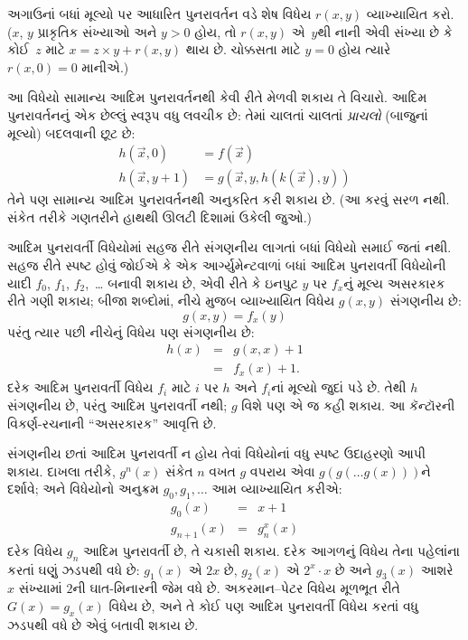 \begin{prob}
  અગાઉનાં બધાં મૂલ્યો પર આધારિત પુનરાવર્તન વડે શેષ વિધેય
  $r(x,y)$ વ્યાખ્યાયિત કરો. ($x$, $y$ પ્રાકૃતિક સંખ્યાઓ અને
  $y > 0$ હોય, તો $r(x,y)$ એ~$y$થી નાની એવી સંખ્યા છે કે કોઈ~$z$
  માટે $x = z\times y + r(x,y)$ થાય છે. ચોક્કસતા માટે $y=0$ હોય
  ત્યારે $r(x,0) = 0$ માનીએ.)
\end{prob}

આ વિધેયો સામાન્ય આદિમ પુનરાવર્તનથી કેવી રીતે મેળવી શકાય તે
વિચારો. આદિમ પુનરાવર્તનનું એક છેલ્લું સ્વરૂપ વધુ લવચીક છે: તેમાં
ચાલતાં ચાલતાં \emph{પ્રાચલો} (બાજુનાં મૂલ્યો) બદલવાની છૂટ છે:
\begin{align*}
h(\vec x, 0) & = f(\vec x) \\
h(\vec x, y+1) & = g(\vec x, y, h(k(\vec x), y))
\end{align*}
તેને પણ સામાન્ય આદિમ પુનરાવર્તનથી અનુકરિત કરી શકાય છે. (આ કરવું
સરળ નથી. સંકેત તરીકે ગણતરીને હાથથી ઊલટી દિશામાં ઉકેલી જુઓ.)
\endgroup


\begingroup
\makeatletter{}\makeatother

\label{guunit:OLP-0223}


આદિમ પુનરાવર્તી વિધેયોમાં સહજ રીતે સંગણનીય લાગતાં બધાં વિધેયો
સમાઈ જતાં નથી. સહજ રીતે સ્પષ્ટ હોવું જોઈએ કે એક આર્ગ્યુમેન્ટવાળાં
બધાં આદિમ પુનરાવર્તી વિધેયોની યાદી
$f_0$, $f_1$, $f_2$,~\dots{} બનાવી શકાય છે, એવી રીતે કે ઇનપુટ
$y$ પર $f_x$નું મૂલ્ય અસરકારક રીતે ગણી શકાય; બીજા શબ્દોમાં, નીચે
મુજબ વ્યાખ્યાયિત વિધેય $g(x,y)$ સંગણનીય છે:
\[
g(x,y) = f_x(y)
\]
પરંતુ ત્યાર પછી નીચેનું વિધેય પણ સંગણનીય છે:
\begin{eqnarray*}
h(x) & = & g(x,x) + 1 \\
& = & f_x(x) +1.
\end{eqnarray*}
દરેક આદિમ પુનરાવર્તી વિધેય $f_i$ માટે $i$ પર $h$ અને $f_i$નાં
મૂલ્યો જુદાં પડે છે. તેથી $h$ સંગણનીય છે, પરંતુ આદિમ પુનરાવર્તી
નથી; $g$ વિશે પણ એ જ કહી શકાય. આ કૅન્ટૉરની વિકર્ણ-રચનાની
``અસરકારક'' આવૃત્તિ છે.

સંગણનીય છતાં આદિમ પુનરાવર્તી ન હોય તેવાં વિધેયોનાં વધુ સ્પષ્ટ
ઉદાહરણો આપી શકાય. દાખલા તરીકે, $g^n(x)$ સંકેત $n$ વખત $g$
વપરાય એવા $g(g(\dots g(x)))$ને દર્શાવે; અને વિધેયોનો અનુક્રમ
$g_0,g_1,\dots$ આમ વ્યાખ્યાયિત કરીએ:
\begin{eqnarray*}
g_0(x) & = & x+1 \\
g_{n + 1}(x) & = & g_n^x(x)
\end{eqnarray*}
દરેક વિધેય $g_n$ આદિમ પુનરાવર્તી છે, તે ચકાસી શકાય. દરેક
આગળનું વિધેય તેના પહેલાંના કરતાં ઘણું ઝડપથી વધે છે: $g_1(x)$ એ
$2x$ છે, $g_2(x)$ એ $2^x \cdot x$ છે અને $g_3(x)$ આશરે $x$
સંખ્યામાં $2$ની ઘાત-મિનારની જેમ વધે છે. અકરમાન--પેટર વિધેય
મૂળભૂત રીતે $G(x) = g_x(x)$ વિધેય છે, અને તે કોઈ પણ આદિમ
પુનરાવર્તી વિધેય કરતાં વધુ ઝડપથી વધે છે એવું બતાવી શકાય છે.

